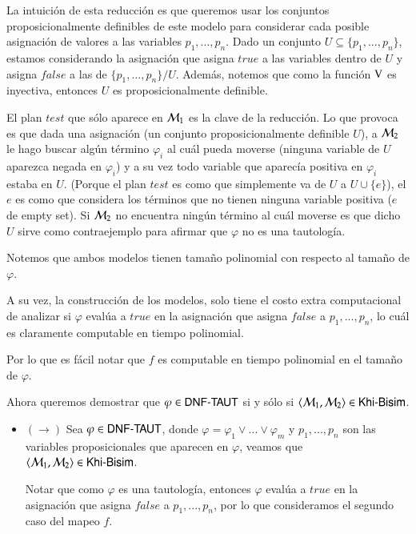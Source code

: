 \begin{demostracion}
    La intuición de esta reducción es que queremos usar los conjuntos proposicionalmente definibles de este modelo para considerar 
    cada posible asignación de valores a las variables $p_1,...,p_n$. Dado un conjunto $U \subseteq \{p_1,...,p_n\}$, 
    estamos considerando la asignación que asigna $true$ a las variables dentro de $U$ y asigna $false$ a las de $\{p_1,...,p_n\}/U$. 
    Además, notemos que como la función $\mathrm{V}$ es inyectiva, entonces $U$ es proposicionalmente definible.
 
    El plan $test$ que sólo aparece en $\mathcal{M}_1$ es la clave de la reducción. Lo que provoca es que dada una asignación 
    (un conjunto proposicionalmente definible $U$), a $\mathcal{M}_2$ le hago buscar algún término $\varphi_i$ al cuál pueda moverse 
    (ninguna variable de $U$ aparezca negada en $\varphi_i$) y a su vez todo variable que aparecía positiva en 
    $\varphi_i$ estaba en $U$. (Porque el plan $test$ es como que simplemente va de $U$ a $U \cup \{e\}$), el $e$ es como que 
    considera los términos que no tienen ninguna variable positiva ($e$ de empty set). Si $\mathcal{M}_2$ no encuentra ningún término 
    al cuál moverse es que dicho $U$ sirve como contraejemplo para afirmar que $\varphi$ no es una tautología.

\medskip\medskip

    Notemos que ambos modelos tienen tamaño polinomial con respecto al tamaño de $\varphi$.

    A su vez, la construcción de los modelos, solo tiene el costo extra computacional de analizar si $\varphi$ evalúa a $true$ 
    en la asignación que asigna $false$ a $p_1,...,p_n$, lo cuál es claramente computable en tiempo polinomial.

    Por lo que es fácil notar que $f$ es computable en tiempo polinomial en el tamaño de $\varphi$.

    Ahora queremos demostrar que $\varphi \in \rm\textsf{DNF-TAUT}$ si y sólo si $\langle \mathcal{M}_1,\mathcal{M}_2 \rangle \in \rm\textsf{Khi-Bisim}$.
    \begin{itemize}

    \item $(\rightarrow)$ Sea $\varphi \in \rm\textsf{DNF-TAUT}$, donde $\varphi = \varphi_1 \vee ... \vee \varphi_m$ y $p_1,...,p_n$ 
    son las variables proposicionales que aparecen en $\varphi$, veamos que $\langle \mathcal{M}_1,\mathcal{M}_2 \rangle \in \rm\textsf{Khi-Bisim}$.

    Notar que como $\varphi$ es una tautología, entonces $\varphi$ evalúa a $true$ en la asignación que asigna $false$ a 
    $p_1,...,p_n$, por lo que consideramos el segundo caso del mapeo $f$. 


\end{itemize}
\end{demostracion}
